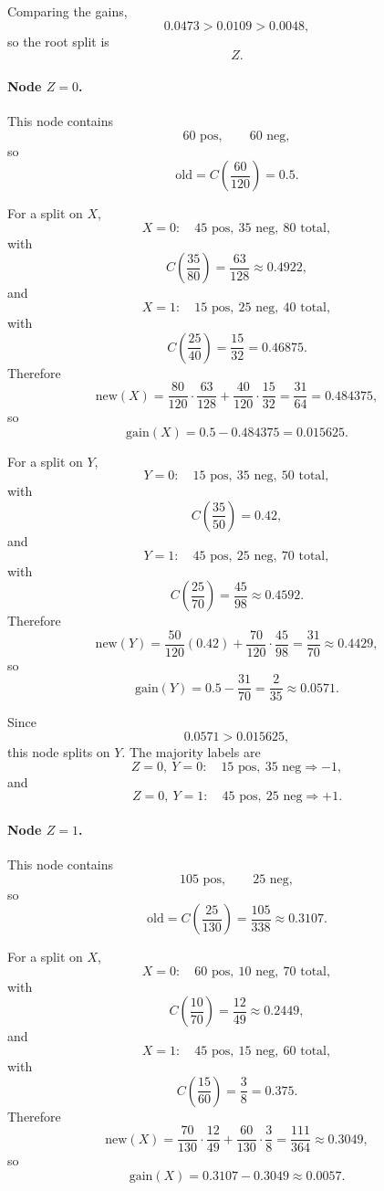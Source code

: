 \documentclass[11pt]{article}
\begin{document}
Comparing the gains,
\[
0.0473>0.0109>0.0048,
\]
so the root split is
\[
\boxed{Z}.
\]

\paragraph{Node \(Z=0\).}

This node contains
\[
60\text{ pos},\qquad60\text{ neg},
\]
so
\[
\mathrm{old}
=
C\!\left(\frac{60}{120}\right)
=
0.5.
\]

For a split on \(X\),
\[
X=0:\quad45\text{ pos},\ 35\text{ neg},\ 80\text{ total},
\]
with
\[
C\!\left(\frac{35}{80}\right)
=
\frac{63}{128}
\approx0.4922,
\]
and
\[
X=1:\quad15\text{ pos},\ 25\text{ neg},\ 40\text{ total},
\]
with
\[
C\!\left(\frac{25}{40}\right)
=
\frac{15}{32}
=
0.46875.
\]
Therefore
\[
\mathrm{new}(X)
=
\frac{80}{120}\cdot\frac{63}{128}
+
\frac{40}{120}\cdot\frac{15}{32}
=
\frac{31}{64}
=
0.484375,
\]
so
\[
\mathrm{gain}(X)
=
0.5-0.484375
=
0.015625.
\]

For a split on \(Y\),
\[
Y=0:\quad15\text{ pos},\ 35\text{ neg},\ 50\text{ total},
\]
with
\[
C\!\left(\frac{35}{50}\right)=0.42,
\]
and
\[
Y=1:\quad45\text{ pos},\ 25\text{ neg},\ 70\text{ total},
\]
with
\[
C\!\left(\frac{25}{70}\right)
=
\frac{45}{98}
\approx0.4592.
\]
Therefore
\[
\mathrm{new}(Y)
=
\frac{50}{120}(0.42)
+
\frac{70}{120}\cdot\frac{45}{98}
=
\frac{31}{70}
\approx0.4429,
\]
so
\[
\mathrm{gain}(Y)
=
0.5-\frac{31}{70}
=
\frac{2}{35}
\approx0.0571.
\]

Since
\[
0.0571>0.015625,
\]
this node splits on \(Y\). The majority labels are
\[
Z=0,\ Y=0:
\quad15\text{ pos},\ 35\text{ neg}
\Rightarrow -1,
\]
and
\[
Z=0,\ Y=1:
\quad45\text{ pos},\ 25\text{ neg}
\Rightarrow +1.
\]

\paragraph{Node \(Z=1\).}

This node contains
\[
105\text{ pos},\qquad25\text{ neg},
\]
so
\[
\mathrm{old}
=
C\!\left(\frac{25}{130}\right)
=
\frac{105}{338}
\approx0.3107.
\]

For a split on \(X\),
\[
X=0:\quad60\text{ pos},\ 10\text{ neg},\ 70\text{ total},
\]
with
\[
C\!\left(\frac{10}{70}\right)
=
\frac{12}{49}
\approx0.2449,
\]
and
\[
X=1:\quad45\text{ pos},\ 15\text{ neg},\ 60\text{ total},
\]
with
\[
C\!\left(\frac{15}{60}\right)
=
\frac{3}{8}
=
0.375.
\]
Therefore
\[
\mathrm{new}(X)
=
\frac{70}{130}\cdot\frac{12}{49}
+
\frac{60}{130}\cdot\frac{3}{8}
=
\frac{111}{364}
\approx0.3049,
\]
so
\[
\mathrm{gain}(X)
=
0.3107-0.3049
\approx0.0057.
\]
\end{document}
